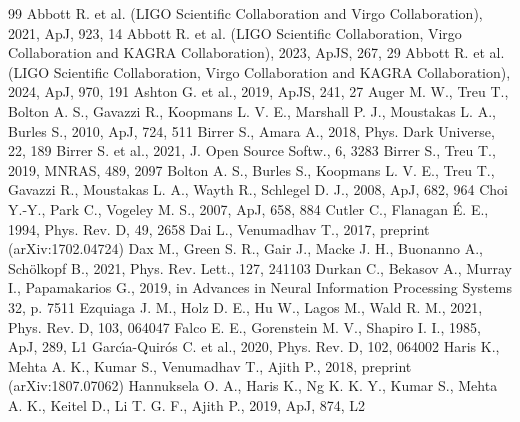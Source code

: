 \begin{thebibliography}{99}
Abbott R. et al. (LIGO Scientific Collaboration and Virgo Collaboration), 2021, ApJ, 923, 14
Abbott R. et al. (LIGO Scientific Collaboration, Virgo Collaboration and KAGRA Collaboration), 2023, ApJS, 267, 29
Abbott R. et al. (LIGO Scientific Collaboration, Virgo Collaboration and KAGRA Collaboration), 2024, ApJ, 970, 191
Ashton G. et al., 2019, ApJS, 241, 27
Auger M. W., Treu T., Bolton A. S., Gavazzi R., Koopmans L. V. E., Marshall P. J., Moustakas L. A., Burles S., 2010, ApJ, 724, 511
Birrer S., Amara A., 2018, Phys. Dark Universe, 22, 189
Birrer S. et al., 2021, J. Open Source Softw., 6, 3283
Birrer S., Treu T., 2019, MNRAS, 489, 2097
Bolton A. S., Burles S., Koopmans L. V. E., Treu T., Gavazzi R., Moustakas L. A., Wayth R., Schlegel D. J., 2008, ApJ, 682, 964
Choi Y.-Y., Park C., Vogeley M. S., 2007, ApJ, 658, 884
Cutler C., Flanagan {\'E}. E., 1994, Phys. Rev. D, 49, 2658
Dai L., Venumadhav T., 2017, preprint (arXiv:1702.04724)
Dax M., Green S. R., Gair J., Macke J. H., Buonanno A., Sch{\"o}lkopf B., 2021, Phys. Rev. Lett., 127, 241103
Durkan C., Bekasov A., Murray I., Papamakarios G., 2019, in Advances in Neural Information Processing Systems 32, p. 7511
Ezquiaga J. M., Holz D. E., Hu W., Lagos M., Wald R. M., 2021, Phys. Rev. D, 103, 064047
Falco E. E., Gorenstein M. V., Shapiro I. I., 1985, ApJ, 289, L1
Garc{\'\i}a-Quir{\'o}s C. et al., 2020, Phys. Rev. D, 102, 064002
Haris K., Mehta A. K., Kumar S., Venumadhav T., Ajith P., 2018, preprint (arXiv:1807.07062)
Hannuksela O. A., Haris K., Ng K. K. Y., Kumar S., Mehta A. K., Keitel D., Li T. G. F., Ajith P., 2019, ApJ, 874, L2

\end{thebibliography}
